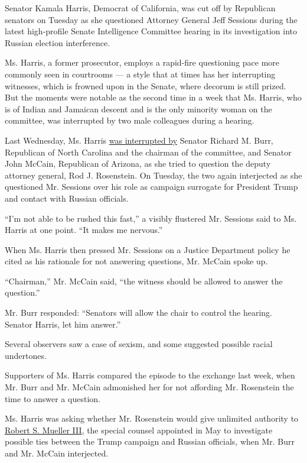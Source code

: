 Senator Kamala Harris, Democrat of California, was cut off by Republican
senators on Tuesday as she questioned Attorney General Jeff Sessions
during the latest high-profile Senate Intelligence Committee hearing in
its investigation into Russian election interference.

Ms. Harris, a former prosecutor, employs a rapid-fire questioning pace
more commonly seen in courtrooms --- a style that at times has her
interrupting witnesses, which is frowned upon in the Senate, where
decorum is still prized. But the moments were notable as the second time
in a week that Ms. Harris, who is of Indian and Jamaican descent and is
the only minority woman on the committee, was interrupted by two male
colleagues during a hearing.

Last Wednesday, Ms. Harris
\href{https://www.washingtonpost.com/politics/congress/gop-senator-admonishes-democrat-for-persistent-questioning/2017/06/07/85ff2b52-4bcd-11e7-987c-42ab5745db2e_story.html?utm_term=.be2eaf992797}{was
interrupted by} Senator Richard M. Burr, Republican of North Carolina
and the chairman of the committee, and Senator John McCain, Republican
of Arizona, as she tried to question the deputy attorney general, Rod J.
Rosenstein. On Tuesday, the two again interjected as she questioned Mr.
Sessions over his role as campaign surrogate for President Trump and
contact with Russian officials.

``I'm not able to be rushed this fast,'' a visibly flustered Mr.
Sessions said to Ms. Harris at one point. ``It makes me nervous.''

When Ms. Harris then pressed Mr. Sessions on a Justice Department policy
he cited as his rationale for not answering questions, Mr. McCain spoke
up.

``Chairman,'' Mr. McCain said, ``the witness should be allowed to answer
the question.''

Mr. Burr responded: ``Senators will allow the chair to control the
hearing. Senator Harris, let him answer.''

Several observers saw a case of sexism, and some suggested possible
racial undertones.

Supporters of Ms. Harris compared the episode to the exchange last week,
when Mr. Burr and Mr. McCain admonished her for not affording Mr.
Rosenstein the time to answer a question.

Ms. Harris was asking whether Mr. Rosenstein would give unlimited
authority to
\href{https://www.nytimes3xbfgragh.onion/2017/05/17/us/politics/robert-mueller-special-counsel-russia-investigation.html}{Robert
S. Mueller III}, the special counsel appointed in May to investigate
possible ties between the Trump campaign and Russian officials, when Mr.
Burr and Mr. McCain interjected.


